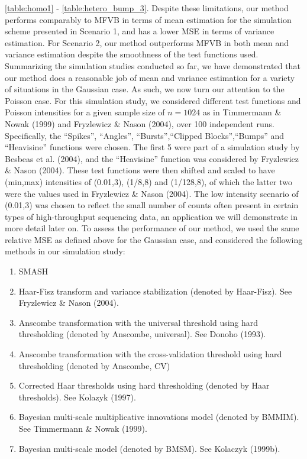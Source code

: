 \documentclass[12pt]{article}
\begin{document}
\ref{table:homo1} - \ref{table:hetero_bump_3}. Despite these limitations, our method performs comparably to MFVB in terms of mean estimation for the simulation scheme presented in Scenario 1, and has a lower MSE in terms of variance estimation. For Scenario 2, our method outperforms MFVB in both mean and variance estimation despite the smoothness of the test functions used. \bigskip\\
Summarizing the simulation studies conducted so far, we have demonstrated that our method does a reasonable job of mean and variance estimation for a variety of situations in the Gaussian case. As such, we now turn our attention to the Poisson case. For this simulation study, we considered different test functions and Poisson intensities for a given sample size of $n=1024$ as in Timmermann \& Nowak (1999) and Fryzlewicz \& Nason (2004), over 100 independent runs. Specifically, the ``Spikes'', ``Angles'', ``Bursts'',``Clipped Blocks'',``Bumps'' and ``Heavisine'' functions were chosen. The first 5 were part of a simulation study by Besbeas et al. (2004), and the ``Heavisine'' function was considered by Fryzlewicz \& Nason (2004). These test functions were then shifted and scaled to have (min,max) intensities of (0.01,3), (1/8,8) and (1/128,8), of which the latter two were the values used in Fryzlewicz \& Nason (2004). The low intensity scenario of (0.01,3) was chosen to reflect the small number of counts often present in certain types of high-throughput sequencing data, an application we will demonstrate in more detail later on. To assess the performance of our method, we used the same relative MSE as defined above for the Gaussian case, and considered the following methods in our simulation study:
\begin{enumerate}
\item SMASH
\item Haar-Fisz transform and variance stabilization (denoted by Haar-Fisz). See Fryzlewicz \& Nason (2004).
\item Anscombe transformation with the universal threshold using hard thresholding (denoted by Anscombe, universal). See Donoho (1993).
\item Anscombe transformation with the cross-validation threshold using hard thresholding (denoted by Anscombe, CV)
\item Corrected Haar thresholds using hard thresholding (denoted by Haar thresholds). See Kolazyk (1997).
\item Bayesian multi-scale multiplicative innovations model (denoted by BMMIM). See Timmermann \& Nowak (1999).
\item Bayesian multi-scale model (denoted by BMSM). See Kolaczyk (1999b).
\end{enumerate}
\end{document}
